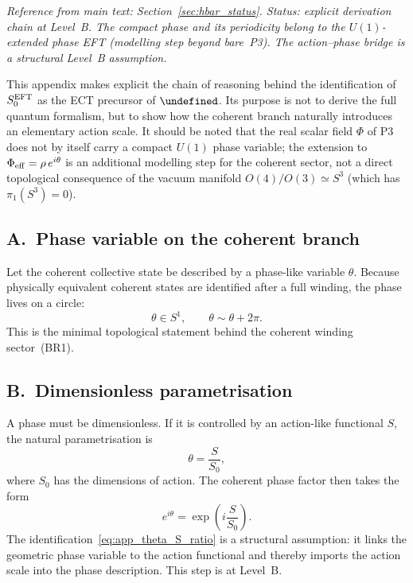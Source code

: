 \documentclass[11pt,a4paper]{article}
\let\hbar\undefined
\numberwithin{equation}{section}
\begin{document}
\textit{Reference from main text: Section~\ref{sec:hbar_status}.
Status: explicit derivation chain at Level~B.
The compact phase and its periodicity belong to the $U(1)$-extended
phase EFT (modelling step beyond bare~P3).
The action--phase bridge is a structural Level~B assumption.}

This appendix makes explicit the chain of reasoning behind the
identification of $S_0^{\rm EFT}$ as the ECT precursor of $\hbar$.
Its purpose is not to derive the full quantum formalism, but to
show how the coherent branch naturally introduces an elementary
action scale.
It should be noted that the real scalar field $\Phi$ of P3 does not
by itself carry a compact $U(1)$ phase variable; the
extension to $\Phi_{\rm eff}=\rho\,e^{i\theta}$ is an additional
modelling step for the coherent sector, not a direct topological
consequence of the vacuum manifold $O(4)/O(3)\simeq S^3$
(which has $\pi_1(S^3)=0$).

\subsection*{A.\ Phase variable on the coherent branch}

Let the coherent collective state be described by a phase-like
variable $\theta$.
Because physically equivalent coherent states are identified after
a full winding, the phase lives on a circle:
\begin{equation}
  \theta \in S^1, \qquad \theta \sim \theta + 2\pi.
  \label{eq:app_theta_circle}
\end{equation}
This is the minimal topological statement behind the coherent winding
sector~(BR1).

\subsection*{B.\ Dimensionless parametrisation}

A phase must be dimensionless.
If it is controlled by an action-like functional $S$, the natural
parametrisation is
\begin{equation}
  \theta = \frac{S}{S_0},
  \label{eq:app_theta_S_ratio}
\end{equation}
where $S_0$ has the dimensions of action.
The coherent phase factor then takes the form
\begin{equation}
  e^{i\theta} = \exp\!\left(i\frac{S}{S_0}\right).
  \label{eq:app_phase_factor}
\end{equation}
The identification~\eqref{eq:app_theta_S_ratio} is a structural
assumption: it links the geometric phase variable to the action
functional and thereby imports the action scale into the phase
description. This step is at Level~B.
\end{document}
